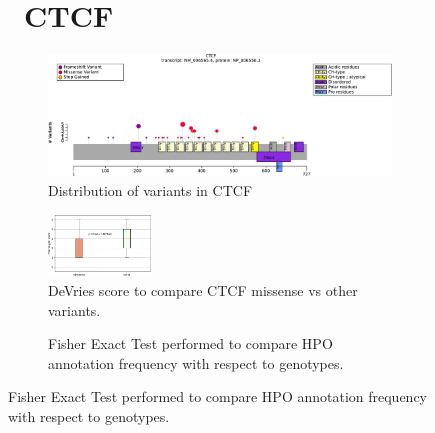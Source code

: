 \begin{figure}[htbp]
\section*{ CTCF}
\centering
\begin{subfigure}[b]{0.95\textwidth}
\centering
\includegraphics[width=\textwidth]{ img/CTCF_protein_diagram.pdf} 
\captionsetup{justification=raggedright,singlelinecheck=false}
\caption{Distribution of variants in CTCF}
\end{subfigure}

\vspace{2em}

\begin{subfigure}[b]{0.95\textwidth}
\centering
\includegraphics[width=0.3\textwidth]{ img/CTCF_stats.pdf} 
\captionsetup{justification=raggedright,singlelinecheck=false}
\caption{DeVries score to compare CTCF missense vs other variants.}
\end{subfigure}

\vspace{2em}

\begin{subfigure}[b]{0.95\textwidth}
\centering
{}
\captionsetup{justification=raggedright,singlelinecheck=false}
\caption{Fisher Exact Test performed to compare HPO annotation frequency with respect to genotypes.}
\end{subfigure}


\end{figure}
